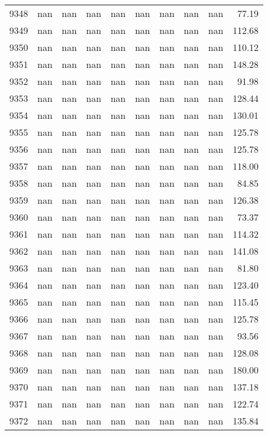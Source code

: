 \begin{tabular}{lrrrrrrrrr}
9348 & nan & nan & nan & nan & nan & nan & nan & nan & 77.19 \\
9349 & nan & nan & nan & nan & nan & nan & nan & nan & 112.68 \\
9350 & nan & nan & nan & nan & nan & nan & nan & nan & 110.12 \\
9351 & nan & nan & nan & nan & nan & nan & nan & nan & 148.28 \\
9352 & nan & nan & nan & nan & nan & nan & nan & nan & 91.98 \\
9353 & nan & nan & nan & nan & nan & nan & nan & nan & 128.44 \\
9354 & nan & nan & nan & nan & nan & nan & nan & nan & 130.01 \\
9355 & nan & nan & nan & nan & nan & nan & nan & nan & 125.78 \\
9356 & nan & nan & nan & nan & nan & nan & nan & nan & 125.78 \\
9357 & nan & nan & nan & nan & nan & nan & nan & nan & 118.00 \\
9358 & nan & nan & nan & nan & nan & nan & nan & nan & 84.85 \\
9359 & nan & nan & nan & nan & nan & nan & nan & nan & 126.38 \\
9360 & nan & nan & nan & nan & nan & nan & nan & nan & 73.37 \\
9361 & nan & nan & nan & nan & nan & nan & nan & nan & 114.32 \\
9362 & nan & nan & nan & nan & nan & nan & nan & nan & 141.08 \\
9363 & nan & nan & nan & nan & nan & nan & nan & nan & 81.80 \\
9364 & nan & nan & nan & nan & nan & nan & nan & nan & 123.40 \\
9365 & nan & nan & nan & nan & nan & nan & nan & nan & 115.45 \\
9366 & nan & nan & nan & nan & nan & nan & nan & nan & 125.78 \\
9367 & nan & nan & nan & nan & nan & nan & nan & nan & 93.56 \\
9368 & nan & nan & nan & nan & nan & nan & nan & nan & 128.08 \\
9369 & nan & nan & nan & nan & nan & nan & nan & nan & 180.00 \\
9370 & nan & nan & nan & nan & nan & nan & nan & nan & 137.18 \\
9371 & nan & nan & nan & nan & nan & nan & nan & nan & 122.74 \\
9372 & nan & nan & nan & nan & nan & nan & nan & nan & 135.84 \\

\end{tabular}
